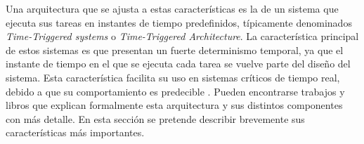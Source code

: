 Una arquitectura que se ajusta a estas características es la de un sistema que ejecuta sus tareas en instantes de tiempo predefinidos, típicamente denominados \textit{Time-Triggered systems} o \textit{Time-Triggered Architecture}. La característica principal de estos sistemas es que presentan un fuerte determinismo temporal, ya que el instante de tiempo en el que se ejecuta cada tarea se vuelve parte del diseño del sistema. Esta característica facilita su uso en sistemas críticos de tiempo real, debido a que su comportamiento es predecible \cite[p.~12]{pont2008patterns}. Pueden encontrarse trabajos \cite{kopetz2003time} \cite{kopetz1998time} y libros \cite{kopetz-2011} \cite{pont2008patterns} que explican formalmente esta arquitectura y sus distintos componentes con más detalle. En esta sección se pretende describir brevemente sus características más importantes.






